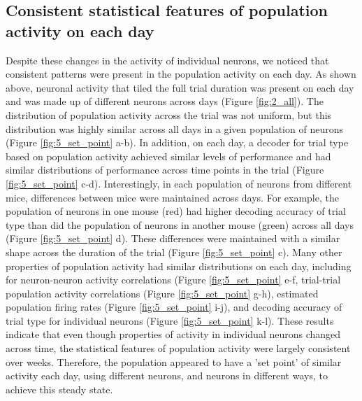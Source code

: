 \subsection{Consistent statistical features of population activity on each day} \label{sec:chap3_set_point}

Despite these changes in the activity of individual neurons, we noticed that consistent patterns were present in the population activity on each day. As shown above, neuronal activity that tiled the full trial duration was present on each day and was made up of different neurons across days (Figure \ref{fig:2_all}). The distribution of population activity across the trial was not uniform, but this distribution was highly similar across all days in a given population of neurons (Figure \ref{fig:5_set_point} a-b). In addition, on each day, a decoder for trial type based on population activity achieved similar levels of performance and had similar distributions of performance across time points in the trial (Figure \ref{fig:5_set_point} c-d). Interestingly, in each population of neurons from different mice, differences between mice were maintained across days. For example, the population of neurons in one mouse (red) had higher decoding accuracy of trial type than did the population of neurons in another mouse (green) across all days (Figure \ref{fig:5_set_point} d). These differences were maintained with a similar shape across the duration of the trial (Figure \ref{fig:5_set_point} c). Many other properties of population activity had similar distributions on each day, including for neuron-neuron activity correlations (Figure \ref{fig:5_set_point} e-f, trial-trial population activity correlations (Figure \ref{fig:5_set_point} g-h), estimated population firing rates (Figure \ref{fig:5_set_point} i-j), and decoding accuracy of trial type for individual neurons (Figure \ref{fig:5_set_point} k-l). These results indicate that even though properties of activity in individual neurons changed across time, the statistical features of population activity were largely consistent over weeks. Therefore, the population appeared to have a 'set point' of similar activity each day, using different neurons, and neurons in different ways, to achieve this steady state.


